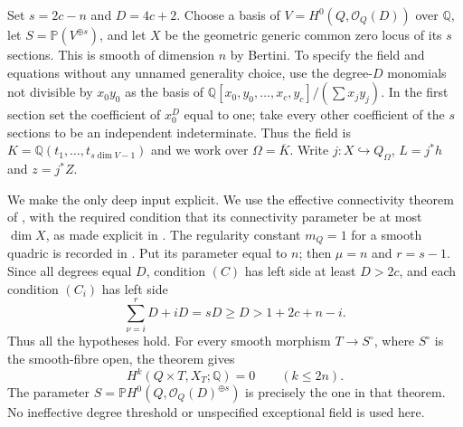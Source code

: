 Set $s=2c-n$ and $D=4c+2$. Choose a basis of
$V=H^0(Q,\mathcal O_Q(D))$ over $\mathbb Q$, let
$S=\mathbb P(V^{\oplus s})$, and let $X$ be the geometric
generic common zero locus of its $s$ sections. This is smooth
of dimension $n$ by Bertini. To specify the field and equations
without any unnamed generality choice, use the degree-$D$
monomials not divisible by $x_0y_0$ as the basis of
$\mathbb Q[x_0,y_0,\ldots,x_c,y_c]/(\sum x_jy_j)$.
In the first section set the coefficient of $x_0^D$ equal to one;
take every other coefficient of the $s$ sections to be an
independent indeterminate. Thus the field is
$K=\mathbb Q(t_1,\ldots,t_{s\dim V-1})$ and we work over
$\Omega=\overline K$. Write $j:X\hookrightarrow Q_\Omega$,
$L=j^*h$ and $z=j^*Z$.

We make the only deep input explicit. We use the effective
connectivity theorem of \citet[Theorem 3.13, p.~23 of the opened
author version]{cyNagel2002}, with the required condition that
its connectivity parameter be at most $\dim X$, as made explicit
in \citet[Theorem 5.11]{cyNagel2004}. The regularity constant
$m_Q=1$ for a smooth quadric is recorded in
\citet[p.~3 of the opened author version, immediately before
Theorem 2]{cyNagel1998}. Put its parameter equal to $n$;
then $\mu=n$ and $r=s-1$. Since all degrees equal $D$, condition
$(C)$ has left side at least $D>2c$, and each condition $(C_i)$
has left side
\[
  \sum_{\nu=i}^{r}D+iD=sD\ge D>1+2c+n-i.
\]
Thus all the hypotheses hold. For every smooth morphism
$T\to S^\circ$, where $S^\circ$ is the smooth-fibre open,
the theorem gives
\begin{equation}\label{eq:nori-effective-connectivity}
 H^k(Q\times T,X_T;\mathbb Q)=0\qquad(k\le2n).
\end{equation}
The parameter $S=\mathbb P H^0(Q,\mathcal O_Q(D)^{\oplus s})$
is precisely the one in that theorem. No ineffective degree
threshold or unspecified exceptional field is used here.

